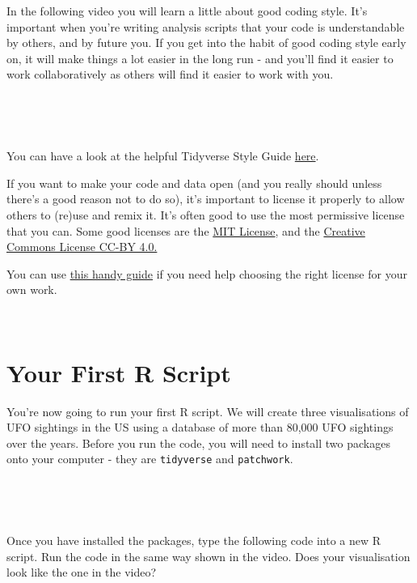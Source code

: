 \documentclass[
]{book}
\begin{document}
In the following video you will learn a little about good coding style. It's important when you're writing analysis scripts that your code is understandable by others, and by future you. If you get into the habit of good coding style early on, it will make things a lot easier in the long run - and you'll find it easier to work collaboratively as others will find it easier to work with you.

~~

~~

You can have a look at the helpful Tidyverse Style Guide \href{https://style.tidyverse.org}{here}.

If you want to make your code and data open (and you really should unless there's a good reason not to do so), it's important to license it properly to allow others to (re)use and remix it. It's often good to use the most permissive license that you can. Some good licenses are the \href{https://opensource.org/licenses/MIT}{MIT License}, and the \href{https://creativecommons.org/licenses/by/4.0/}{Creative Commons License CC-BY 4.0.}

You can use \href{https://choosealicense.com}{this handy guide} if you need help choosing the right license for your own work.

~~

\hypertarget{your-first-r-script}{%
\section{Your First R Script}\label{your-first-r-script}}

You're now going to run your first R script. We will create three visualisations of UFO sightings in the US using a database of more than 80,000 UFO sightings over the years. Before you run the code, you will need to install two packages onto your computer - they are \texttt{tidyverse} and \texttt{patchwork}.

~~

~~

Once you have installed the packages, type the following code into a new R script. Run the code in the same way shown in the video. Does your visualisation look like the one in the video?
\end{document}

